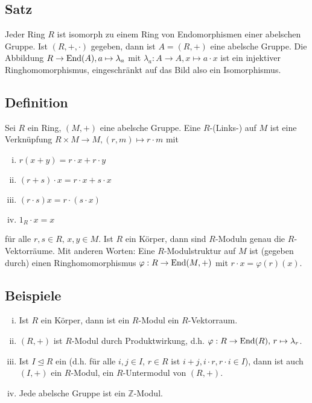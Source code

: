 \subsection[Satz: Jeder Ring ist isomorph zu einem Endomorphismenring]{Satz} %
\label{sub:21}
Jeder Ring $R$ ist isomorph zu einem Ring von Endomorphismen einer abelschen Gruppe.
Ist $(R,+, \cdot )$ gegeben, dann ist $A=(R,+)$ eine abelsche Gruppe. Die Abbildung $R \to \operatorname{End}(A), a \mapsto \lambda_a $ mit 
$\lambda_a : A \to A, x \mapsto a \cdot x$ ist ein injektiver Ringhomomorphismus, eingeschränkt auf das Bild also ein Isomorphismus.

\subsection[Definition: Modul]{Definition} %
\label{sub:22}
Sei $R$ ein Ring, $(M,+)$ eine abelsche Gruppe. Eine $R$-(Links-) auf $M$ ist eine Verknüpfung $R \times M \to M, (r,m) \mapsto r \cdot m$ mit
\begin{enumerate}[(i)]
	\item $r(x+y)= r \cdot x + r \cdot y$
	\item $(r+s) \cdot x = r \cdot x + s \cdot x$
	\item $(r \cdot s) x = r \cdot (s \cdot x)$
	\item $1_R \cdot x = x$
\end{enumerate}
für alle $r,s \in R, \,x,y \in M$. Ist $R$ ein Körper, dann sind $R$-Moduln genau die $R$-Vektorräume. Mit anderen Worten: Eine $R$-Modulstruktur auf $M$ ist 
(gegeben durch) einen Ringhomomorphismus $\varphi : R \to \operatorname{End}(M,+)$ mit $r \cdot x = \varphi(r) (x)$.

\subsection[Beispiele für Moduln]{Beispiele} %
\label{sub:23}
\begin{enumerate}[(i)]
	\item Ist $R$ ein Körper, dann ist ein $R$-Modul ein $R$-Vektorraum.
	\item $(R,+)$ ist $R$-Modul durch Produktwirkung, d.h. $\varphi : R \to \operatorname{End}(R),\, r \mapsto \lambda_r$.
	\item Ist $I \unlhd R$ ein  (d.h. für alle $i,j \in I$, $r \in R$ ist $i + j, i \cdot r, r \cdot i \in I$), dann ist auch $(I,+)$ ein
	$R$-Modul, ein $R$-Untermodul von $(R,+)$.
	\item Jede abelsche Gruppe ist ein $\mathds{Z}$-Modul. 
\end{enumerate}

